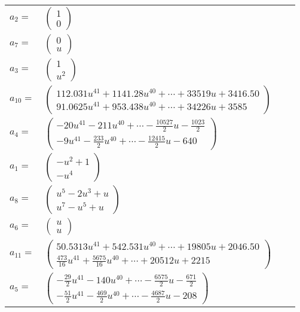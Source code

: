 \documentclass[1p]{elsarticle_modified}
\theoremstyle{definition}
\begin{document}
\begin{tabular}{m{7pt} m{180pt} m{7pt} m{180pt} }
\flushright $a_{2}=$&$\begin{pmatrix}1\\0\end{pmatrix}$ \\
\flushright $a_{7}=$&$\begin{pmatrix}0\\u\end{pmatrix}$ \\
\flushright $a_{3}=$&$\begin{pmatrix}1\\u^2\end{pmatrix}$ \\
\flushright $a_{10}=$&$\begin{pmatrix}112.031 u^{41}+1141.28 u^{40}+\cdots+33519 u+3416.50\\91.0625 u^{41}+953.438 u^{40}+\cdots+34226 u+3585\end{pmatrix}$ \\
\flushright $a_{4}=$&$\begin{pmatrix}-20 u^{41}-211 u^{40}+\cdots-\frac{10527}{2} u-\frac{1023}{2}\\-9 u^{41}-\frac{233}{2} u^{40}+\cdots-\frac{12415}{2} u-640\end{pmatrix}$ \\
\flushright $a_{1}=$&$\begin{pmatrix}- u^2+1\\- u^4\end{pmatrix}$ \\
\flushright $a_{8}=$&$\begin{pmatrix}u^5-2 u^3+u\\u^7- u^5+u\end{pmatrix}$ \\
\flushright $a_{6}=$&$\begin{pmatrix}u\\u\end{pmatrix}$ \\
\flushright $a_{11}=$&$\begin{pmatrix}50.5313 u^{41}+542.531 u^{40}+\cdots+19805 u+2046.50\\\frac{473}{16} u^{41}+\frac{5675}{16} u^{40}+\cdots+20512 u+2215\end{pmatrix}$ \\
\flushright $a_{5}=$&$\begin{pmatrix}-\frac{29}{2} u^{41}-140 u^{40}+\cdots-\frac{6575}{2} u-\frac{671}{2}\\-\frac{51}{2} u^{41}-\frac{469}{2} u^{40}+\cdots-\frac{4687}{2} u-208\end{pmatrix}$ \\

\end{tabular}
\end{document}
